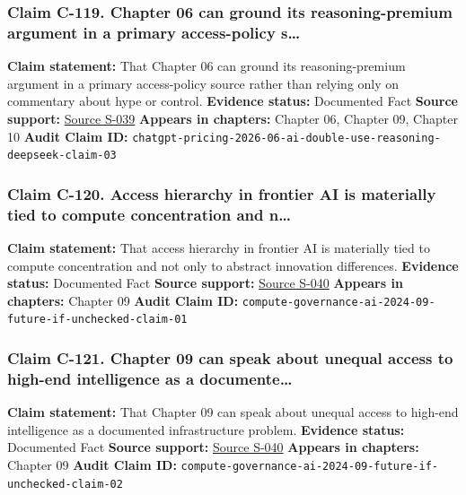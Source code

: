 \documentclass[
  american,
  11pt,
  letterpaper,
]{article}
\begin{document}
\subsubsection{Claim C-119. Chapter 06 can ground its reasoning-premium
argument in a primary access-policy
s\ldots{}}\label{claim-c-119-chapter-06-can-ground-its-reasoning-premium-argument-in-a-primary-access-policy-s}

\textbf{Claim statement:} That Chapter 06 can ground its
reasoning-premium argument in a primary access-policy source rather than
relying only on commentary about hype or control. \textbf{Evidence
status:} Documented Fact \textbf{Source support:}
\hyperref[source-s-039-chatgpt-plans-free-go-plus-pro-business-and-enterprise]{Source
S-039} \textbf{Appears in chapters:} Chapter 06, Chapter 09, Chapter 10
\textbf{Audit Claim ID:}
\texttt{chatgpt-pricing-2026-06-ai-double-use-reasoning-deepseek-claim-03}

\subsubsection{Claim C-120. Access hierarchy in frontier AI is
materially tied to compute concentration and
n\ldots{}}\label{claim-c-120-access-hierarchy-in-frontier-ai-is-materially-tied-to-compute-concentration-and-n}

\textbf{Claim statement:} That access hierarchy in frontier AI is
materially tied to compute concentration and not only to abstract
innovation differences. \textbf{Evidence status:} Documented Fact
\textbf{Source support:}
\hyperref[source-s-040-computing-power-and-the-governance-of-artificial-intelligence]{Source
S-040} \textbf{Appears in chapters:} Chapter 09 \textbf{Audit Claim ID:}
\texttt{compute-governance-ai-2024-09-future-if-unchecked-claim-01}

\subsubsection{Claim C-121. Chapter 09 can speak about unequal access to
high-end intelligence as a
documente\ldots{}}\label{claim-c-121-chapter-09-can-speak-about-unequal-access-to-high-end-intelligence-as-a-documente}

\textbf{Claim statement:} That Chapter 09 can speak about unequal access
to high-end intelligence as a documented infrastructure problem.
\textbf{Evidence status:} Documented Fact \textbf{Source support:}
\hyperref[source-s-040-computing-power-and-the-governance-of-artificial-intelligence]{Source
S-040} \textbf{Appears in chapters:} Chapter 09 \textbf{Audit Claim ID:}
\texttt{compute-governance-ai-2024-09-future-if-unchecked-claim-02}
\end{document}
